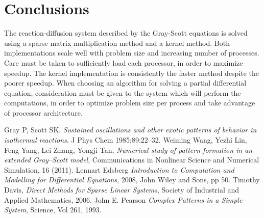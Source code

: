 \documentclass[a4paper,11pt]{article}
\begin{document}
\section*{Conclusions}
The reaction-diffusion system described by the Gray-Scott equations is solved using a sparse matrix multiplication method and a kernel method.  Both implementations scale well with problem size and increasing number of processes. Care must be taken to sufficiently load each processor, in order to maximize speedup. The kernel implementation is consistently the faster method despite the poorer speedup. When choosing an algorithm for solving a partial differential equation, consideration must be given to the system which will perform the computations, in order to optimize problem size per process and take advantage of processor architecture. 

\clearpage
\begin{thebibliography}{}
 Gray P, Scott SK. {\it Sustained oscillations and other exotic patterns of behavior in isothermal reactions}. J Phys Chem 1985;89:22–32.
 Weiming Wang, Yezhi Lin, Feng Yang, Lei Zhang, Yongji Tan, {\it Numerical study of pattern formation in an extended Gray–Scott model}, Communications in Nonlinear Science and Numerical Simulation, 16 (2011).
 Lennart Edsberg {\it Introduction to Computation and Modelling for Differential Equations}, 2008, John Wiley and Sons, pp 50.
 Timothy Davis, {\it Direct Methods for Sparse Linear Systems}, Society of Industrial and Applied Mathematics, 2006.
 John E. Pearson {\it Complex Patterns in a Simple System}, Science, Vol 261, 1993.
\end{thebibliography}
\end{document}
